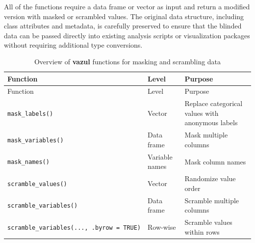 All of the functions require a data frame or vector as input and return a modified version with masked or scrambled values. The original data structure, including class attributes and metadata, is carefully preserved to ensure that the blinded data can be passed directly into existing analysis scripts or visualization packages without requiring additional type conversions.

\begin{longtable}[]{@{}
  >{\raggedright\arraybackslash}p{}
  >{\raggedright\arraybackslash}p{}
  >{\raggedright\arraybackslash}p{}@{}}
\caption{Overview of \textbf{vazul} functions for masking and scrambling data}\tabularnewline
\toprule\noalign{}
\begin{minipage}[b]{\linewidth}\raggedright
Function
\end{minipage} & \begin{minipage}[b]{\linewidth}\raggedright
Level
\end{minipage} & \begin{minipage}[b]{\linewidth}\raggedright
Purpose
\end{minipage} \\
\midrule\noalign{}
\endfirsthead
\toprule\noalign{}
\begin{minipage}[b]{\linewidth}\raggedright
Function
\end{minipage} & \begin{minipage}[b]{\linewidth}\raggedright
Level
\end{minipage} & \begin{minipage}[b]{\linewidth}\raggedright
Purpose
\end{minipage} \\
\midrule\noalign{}
\endhead
\bottomrule\noalign{}
\endlastfoot
\texttt{mask\_labels()} & Vector & Replace categorical values with anonymous labels \\
\texttt{mask\_variables()} & Data frame & Mask multiple columns \\
\texttt{mask\_names()} & Variable names & Mask column names \\
\texttt{scramble\_values()} & Vector & Randomize value order \\
\texttt{scramble\_variables()} & Data frame & Scramble multiple columns \\
\texttt{scramble\_variables(...,\ .byrow\ =\ TRUE)} & Row-wise & Scramble values within rows \\
\end{longtable}

